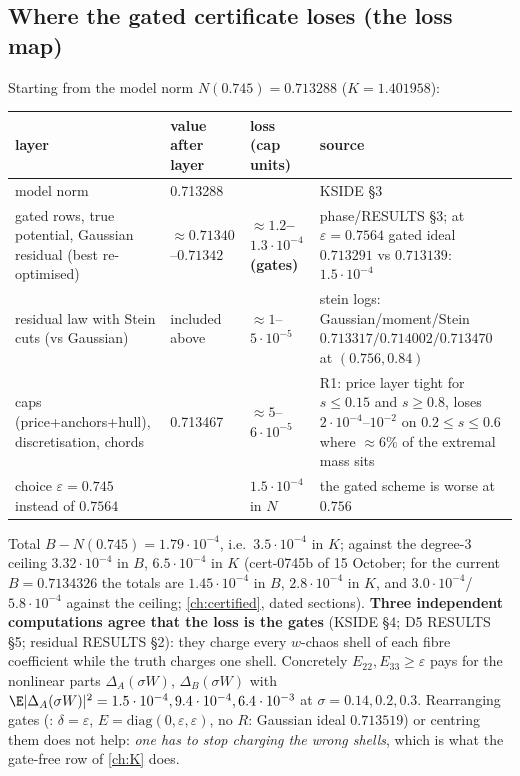 \subsection{Where the gated certificate loses (the loss map)}\label{sec:lossmap}
Starting from the model norm $N(0.745)=0.713288$ ($K=1.401958$):
\begin{center}\small
\begin{tabular}{p{5.2cm}p{2.6cm}p{2.9cm}p{4.6cm}}\toprule
layer & value after layer & loss (cap units) & source\\\midrule
model norm & 0.713288 & & KSIDE \S3\\
gated rows, true potential, Gaussian residual (best re-optimised) & $\approx0.71340$--$0.71342$ & \textbf{$\approx1.2$--$1.3\cdot10^{-4}$ (gates)} & phase/RESULTS \S3; at $\varepsilon=0.7564$ gated ideal $0.713291$ vs $0.713139$: $1.5\cdot10^{-4}$\\
residual law with Stein cuts (vs Gaussian) & included above & $\approx1$--$5\cdot10^{-5}$ & stein logs: Gaussian/moment/Stein $0.713317/0.714002/0.713470$ at $(0.756,0.84)$\\
caps (price+anchors+hull), discretisation, chords & 0.713467 & $\approx5$--$6\cdot10^{-5}$ & R1: price layer tight for $s\le0.15$ and $s\ge0.8$, loses $2\cdot10^{-4}$--$10^{-2}$ on $0.2\le s\le0.6$ where $\approx6\%$ of the extremal mass sits\\
choice $\varepsilon=0.745$ instead of $0.7564$ & & $1.5\cdot10^{-4}$ in $N$ & the gated scheme is worse at $0.756$\\\bottomrule
\end{tabular}
\end{center}
Total $B-N(0.745)=1.79\cdot10^{-4}$, i.e.\ $3.5\cdot10^{-4}$ in $K$; against the degree-3 ceiling $3.32\cdot10^{-4}$ in $B$, $6.5\cdot10^{-4}$ in $K$
(cert-0745b of 15 October; for the current $B=0.7134326$ the totals are $1.45\cdot10^{-4}$ in $B$, $2.8\cdot10^{-4}$ in $K$, and $3.0\cdot10^{-4}$/$5.8\cdot10^{-4}$
against the ceiling; \autoref{ch:certified}, dated sections).
\textbf{Three independent computations agree that the loss is the gates} (KSIDE \S4; D5 RESULTS \S5; residual RESULTS \S2): they charge every $w$-chaos shell
of each fibre coefficient while the truth charges one shell. Concretely $E_{22},E_{33}\ge\varepsilon$ pays for the nonlinear parts $\Delta_A(\sigma W)$,
$\Delta_B(\sigma W)$ with $\E|\Delta_A(\sigma W)|^2=1.5\cdot10^{-4},9.4\cdot10^{-4},6.4\cdot10^{-3}$ at $\sigma=0.14,0.2,0.3$. Rearranging gates (:
$\delta=\varepsilon$, $E=\mathrm{diag}(0,\varepsilon,\varepsilon)$, no $R$: Gaussian ideal $0.713519$) or centring them does not help: \emph{one has to stop charging the wrong
shells}, which is what the gate-free row of \autoref{ch:K} does.
